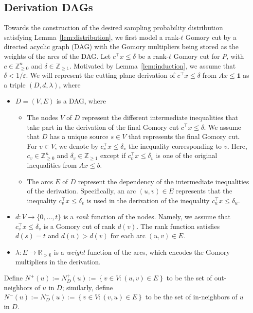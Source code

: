 \documentclass[11pt]{article}
\newcommand{\R}{\mathbb{R}}
\newcommand{\Z}{\mathbb{Z}}
\newcommand{\one}{\mathbf{1}}
\newcommand{\eps}{\varepsilon}
\newcommand{\numrounds}{t}
\newcommand{\rhs}{\delta}
\newcommand{\set}[1]{\left\{#1\right\}}
\theoremstyle{remark}
\begin{document}
\subsection{Derivation DAGs}
\label{subsec:derivation-DAG}

Towards the construction of the desired sampling probability distribution satisfying Lemma~\ref{lem:distribution}, we first model a rank-$t$ Gomory cut by a directed acyclic graph (DAG) with the Gomory multipliers being stored as the weights of the arcs of the DAG.
Let $c^\intercal x \le \rhs$ be a rank-$\numrounds$ Gomory cut for $P$, with $c \in \Z^n_{\ge 0}$ and $\rhs \in \Z_{\ge 1}$. Motivated by Lemma~\ref{lem:induction}, we assume that $\rhs < 1/\eps$. 
We will represent the cutting plane derivation of $c^\intercal x \le \rhs$ from $Ax \le \one$ as a triple $(D,d,\lambda)$, where 
\begin{itemize}
    \item $D=(V, E)$ is a DAG, where 
    \begin{itemize}
        \item The nodes $V$ of $D$ represent the different intermediate inequalities that take part in the derivation of the final Gomory cut $c^\intercal x \le \rhs$. We assume that $D$ has a unique source $s \in V$ that represents the final Gomory cut. For $v \in V$, we denote by $c_v^\intercal x \le \rhs_v$ the inequality corresponding to $v$. 
 Here, $c_v \in \Z^n_{\ge 0}$ and $\rhs_v \in \Z_{\ge 1}$ except if $c_v^\intercal x \le \rhs_v$ is one of the original inequalities from $Ax\le b$.
        \item The arcs $E$ of $D$ represent the dependency of the intermediate inequalities of the derivation. Specifically, an arc $(u,v) \in E$ represents that the inequality $c_v^\intercal x \le \rhs_v$ is used in the derivation of the inequality $c_u^\intercal x \le \rhs_u$.
    \end{itemize}
    \item $d : V \to \{0,\ldots,\numrounds\}$ is a \emph{rank} function of the nodes. Namely,
	we assume that $c_v^\intercal x \le \rhs_v$ is a Gomory cut of rank $d(v)$.
	    The rank function satisfies $d(s) = \numrounds$ and $d(u) > d(v)$ for each arc $(u,v) \in E$.
    \item $\lambda : E \to \R_{> 0}$ is a \emph{weight} function of the arcs, which encodes the Gomory multipliers in the derivation. 
\end{itemize}
Define $N^+(u):=N^+_D(u):=\set{v\in V: (u, v) \in E}$ to be the set of out-neighbors of $u$ in $D$; similarly, define $N^-(u):=N^-_D(u):=\set{v\in V: (v, u) \in E}$ to be the set of in-neighbors of $u$ in $D$.
\end{document}
